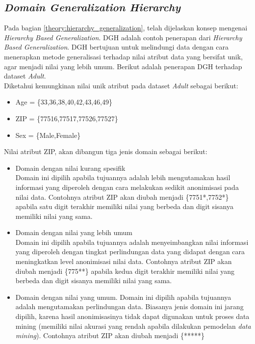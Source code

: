 \subsection{\textit{Domain Generalization Hierarchy}}
Pada bagian \ref{theory:hierarchy_generalization}, telah dijelaskan konsep mengenai \textit{Hierarchy Based Generalization}. DGH adalah contoh penerapan dari \textit{Hierarchy Based Generalization}. DGH bertujuan untuk melindungi data dengan cara menerapkan metode generalisasi terhadap nilai atribut data yang bersifat unik, agar menjadi nilai yang lebih umum. Berikut adalah penerapan DGH terhadap dataset \textit{Adult}. \\

\noindent Diketahui kemungkinan nilai unik atribut pada dataset \textit{Adult} sebagai berikut:

\begin{itemize}
\item Age = \{33,36,38,40,42,43,46,49\}
\item ZIP = \{77516,77517,77526,77527\}
\item Sex = \{Male,Female\}
\end{itemize}

\noindent Nilai atribut ZIP, akan dibangun tiga jenis domain sebagai berikut:

\begin{itemize}
\item Domain dengan nilai kurang spesifik\\
Domain ini dipilih apabila tujuannya adalah lebih mengutamakan hasil informasi yang diperoleh dengan cara melakukan sedikit anonimisasi pada nilai data. Contohnya atribut ZIP akan diubah menjadi \{7751*,7752*\} apabila satu digit terakhir memiliki nilai yang berbeda dan digit sisanya memiliki nilai yang sama.
\item Domain dengan nilai yang lebih umum\\
Domain ini dipilih apabila tujuannya adalah menyeimbangkan nilai informasi yang diperoleh dengan tingkat perlindungan data yang didapat dengan cara meningkatkan level anonimisasi nilai data. Contohnya atribut ZIP akan diubah menjadi \{775**\} apabila kedua digit terakhir memiliki nilai yang berbeda dan digit sisanya memiliki nilai yang sama.
\item Domain dengan nilai yang umum.
Domain ini dipilih apabila tujuannya adalah mengutamakan perlindungan data. Biasanya jenis domain ini jarang dipilih, karena hasil anonimisasinya tidak dapat digunakan untuk proses data mining (memiliki nilai akurasi yang rendah apabila dilakukan pemodelan \textit{data mining}). Contohnya atribut ZIP akan diubah menjadi \{*****\}

\end{itemize}

